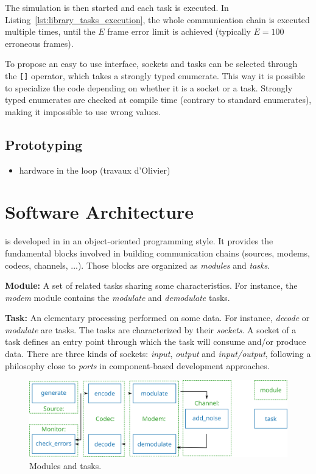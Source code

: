 The simulation is then started and each task is executed. In
Listing~\ref{lst:library_tasks_execution}, the whole communication chain is
executed multiple times, until the $E$ frame error limit is achieved (typically
$E = 100$ erroneous frames).

To propose an easy to use interface, sockets and tasks can be selected through
the \verb|[]| operator, which takes a \Cxx strongly typed enumerate. This way it
is possible to specialize the code depending on whether it is a socket or a
task. Strongly typed enumerates are checked at compile time (contrary to
standard enumerates), making it impossible to use wrong values.

\subsection{Prototyping~\cite{Cassagne2017,Cassagne2017a}}

\begin{itemize}
  \item hardware in the loop (travaux d'Olivier)
\end{itemize}

\section{Software Architecture}
\label{sec:soft_archi}

\AFFECT is developed in \Cxx in an object-oriented programming style. It
provides the fundamental blocks involved in building communication chains
(sources, modems, codecs, channels, ...). Those blocks are organized as
\textit{modules} and \textit{tasks}.

\textbf{Module:} A set of related tasks sharing some characteristics. For
instance, the \textit{modem} module contains the \textit{modulate} and
\textit{demodulate} tasks.

\textbf{Task:} An elementary processing performed on some data. For instance,
\textit{decode} or \textit{modulate} are tasks. The tasks are characterized by
their \textit{sockets}. A socket of a task defines an entry point through which
the task will consume and/or produce data. There are three kinds of sockets:
\textit{input}, \textit{output} and \textit{input/output}, following a
philosophy close to \emph{ports} in component-based development approaches.

\begin{figure}
  \centering
  \includegraphics[width=0.70\linewidth]{soft_archi/com_chain_task_module}
  \caption{Modules and tasks.}
  \label{fig:soft_archi_com_chain_task_module}
\end{figure}

